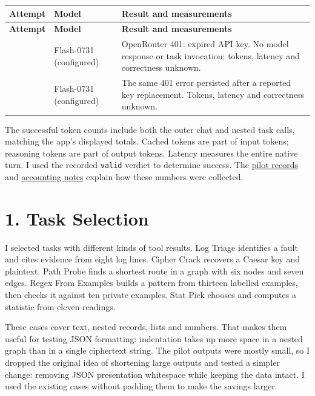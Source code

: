 \documentclass[10pt,letterpaper]{article}
\begin{document}
\begingroup
\small
\setlength{\tabcolsep}{4pt}
\renewcommand{\arraystretch}{1.15}
\begin{longtable}{@{}>{\raggedright\arraybackslash}p{.10\linewidth}>{\raggedright\arraybackslash}p{.23\linewidth}>{\raggedright\arraybackslash}p{}@{}}
\toprule
\textbf{Attempt} & \textbf{Model} & \textbf{Result and measurements} \\
\midrule
\endfirsthead
\toprule
\textbf{Attempt} & \textbf{Model} & \textbf{Result and measurements} \\
\midrule
\endhead
\bottomrule
\endfoot
1 & Flash-0731 (configured) & OpenRouter 401: expired API key. No model response or task invocation; tokens, latency and correctness unknown. \\
2 & Flash-0731 (configured) & The same 401 error persisted after a reported key replacement. Tokens, latency and correctness unknown. \\
\end{longtable}
\endgroup

The successful token counts include both the outer chat and nested task calls, matching the app's displayed totals. Cached tokens are part of input tokens; reasoning tokens are part of output tokens. Latency measures the entire native turn. I used the recorded \texttt{valid} verdict to determine success. The \href{https://github.com/a-little-hoof/580-final/blob/main/study/task0/summaries/pilot-results.md}{pilot records} and \href{https://github.com/a-little-hoof/580-final/blob/main/docs/TRACE\_ACCOUNTING.md}{accounting notes} explain how these numbers were collected.

\section*{1. Task Selection}

I selected tasks with different kinds of tool results. Log Triage identifies a fault and cites evidence from eight log lines. Cipher Crack recovers a Caesar key and plaintext. Path Probe finds a shortest route in a graph with six nodes and seven edges. Regex From Examples builds a pattern from thirteen labelled examples, then checks it against ten private examples. Stat Pick chooses and computes a statistic from eleven readings.

These cases cover text, nested records, lists and numbers. That makes them useful for testing JSON formatting: indentation takes up more space in a nested graph than in a single ciphertext string. The pilot outputs were mostly small, so I dropped the original idea of shortening large outputs and tested a simpler change: removing JSON presentation whitespace while keeping the data intact. I used the existing cases without padding them to make the savings larger.
\end{document}
